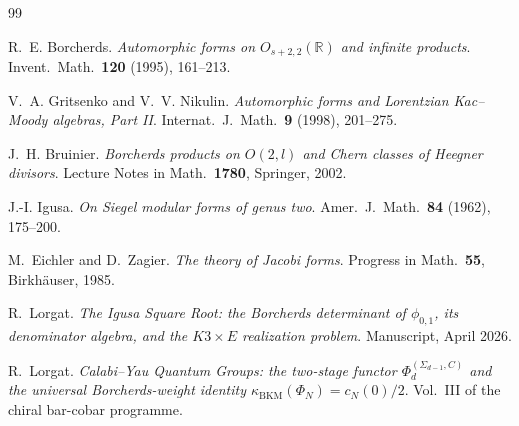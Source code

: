 \documentclass[11pt]{memoir}
\providecommand{\BKM}{\operatorname{BKM}}
\providecommand{\bR}{\mathbb{R}}
\begin{document}

\begin{thebibliography}{99}

R.~E. Borcherds. \emph{Automorphic forms on $O_{s+2,2}(\bR)$ and
infinite products}. Invent.\ Math.\ \textbf{120} (1995), 161--213.

V.~A. Gritsenko and V.~V. Nikulin. \emph{Automorphic forms and
Lorentzian Kac--Moody algebras, Part II}. Internat.\ J.\ Math.\
\textbf{9} (1998), 201--275.

J.~H. Bruinier. \emph{Borcherds products on $O(2,l)$ and Chern classes
of Heegner divisors}. Lecture Notes in Math.\ \textbf{1780},
Springer, 2002.

J.-I. Igusa. \emph{On Siegel modular forms of genus two}.
Amer.\ J.\ Math.\ \textbf{84} (1962), 175--200.

M.~Eichler and D.~Zagier. \emph{The theory of Jacobi forms}.
Progress in Math.\ \textbf{55}, Birkh\"auser, 1985.

R.~Lorgat. \emph{The Igusa Square Root: the Borcherds determinant of
$\phi_{0,1}$, its denominator algebra, and the $K3 \times E$
realization problem}. Manuscript, April 2026.

R.~Lorgat. \emph{Calabi--Yau Quantum Groups: the two-stage functor
$\Phi_d^{(\Sigma_{d-1}, C)}$ and the universal Borcherds-weight
identity $\kappa_{\BKM}(\Phi_N) = c_N(0)/2$}. Vol.~III of the
chiral bar-cobar programme.

\end{thebibliography}
\end{document}
